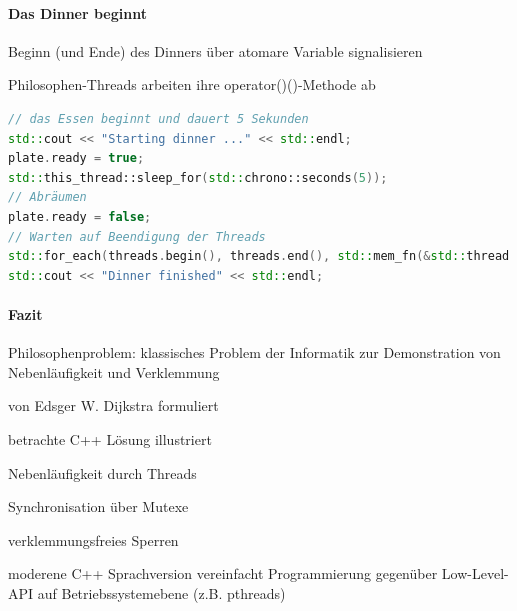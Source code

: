 \documentclass[10pt]{article}
\begin{document}
  \paragraph{Das Dinner beginnt}
  
  \begin{itemize*}
    \item Beginn (und Ende) des Dinners über atomare Variable signalisieren
    \item Philosophen-Threads arbeiten ihre operator()()-Methode ab
  \end{itemize*}
  \begin{lstlisting}[language=C++]
// das Essen beginnt und dauert 5 Sekunden
std::cout << "Starting dinner ..." << std::endl;
plate.ready = true;
std::this_thread::sleep_for(std::chrono::seconds(5));
// Abräumen
plate.ready = false;
// Warten auf Beendigung der Threads
std::for_each(threads.begin(), threads.end(), std::mem_fn(&std::thread::join));
std::cout << "Dinner finished" << std::endl;
\end{lstlisting}
  
  \paragraph{Fazit}
  
  \begin{itemize*}
    \item Philosophenproblem: klassisches Problem der Informatik zur Demonstration von Nebenläufigkeit und Verklemmung
    \item von Edsger W. Dijkstra formuliert
    \item betrachte C++ Lösung illustriert
    \begin{itemize*}
      \item Nebenläufigkeit durch Threads
      \item Synchronisation über Mutexe
      \item verklemmungsfreies Sperren
    \end{itemize*}
    \item moderene C++ Sprachversion vereinfacht Programmierung gegenüber Low-Level-API auf Betriebssystemebene (z.B. pthreads)
  \end{itemize*}
  
\end{document}
